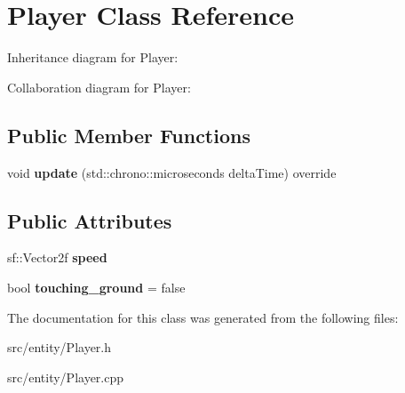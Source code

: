 \hypertarget{classPlayer}{\section{Player Class Reference}
\label{classPlayer}
}


Inheritance diagram for Player\-:


Collaboration diagram for Player\-:
\subsection*{Public Member Functions}
\begin{DoxyCompactItemize}
\item 
\hypertarget{classPlayer_ae3153f2d8d00bcb2ea1025f394d29041}{void {\bfseries update} (std\-::chrono\-::microseconds delta\-Time) override}\label{classPlayer_ae3153f2d8d00bcb2ea1025f394d29041}

\end{DoxyCompactItemize}
\subsection*{Public Attributes}
\begin{DoxyCompactItemize}
\item 
\hypertarget{classPlayer_aac86a0c16c74e68268e6f37f1b21659f}{sf\-::\-Vector2f {\bfseries speed}}\label{classPlayer_aac86a0c16c74e68268e6f37f1b21659f}

\item 
\hypertarget{classPlayer_a61a49594880340b6187d99016e831f20}{bool {\bfseries touching\-\_\-ground} = false}\label{classPlayer_a61a49594880340b6187d99016e831f20}

\end{DoxyCompactItemize}


The documentation for this class was generated from the following files\-:\begin{DoxyCompactItemize}
\item 
src/entity/Player.\-h\item 
src/entity/Player.\-cpp\end{DoxyCompactItemize}
